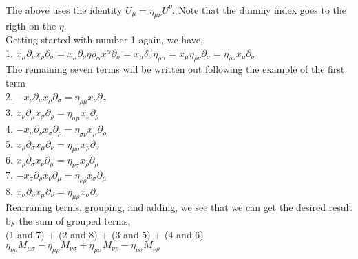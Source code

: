 \documentclass[prb,preprint]
{revtex4-1}
\begin{document}
\\
The above uses the identity $U_\mu = \eta_{\mu\nu}U^\nu$.  Note that the dummy index goes to the rigth on the $\eta$.
\\
Getting started with number 1 again, we have,
\\
1.  $x_\mu \partial_\nu x_\rho \partial_\sigma = x_\mu\partial_\nu\eta{\rho_\alpha}x^\alpha \partial_\sigma = x_\mu \delta_\nu^\alpha \eta_{\rho\alpha} = x_\mu \eta_{\rho\nu} \partial_\sigma = \eta_{\rho\nu} x_\mu \partial_\sigma$
\\
The remaining seven terms will be written out following the example of the first term
\\
2.  $-x_\nu \partial_\mu x_\rho \partial_\sigma = \eta_{\rho\mu} x_\nu \partial_\sigma$
\\
3.  $x_\nu \partial_\mu x_\sigma \partial_\rho = \eta_{\sigma\mu} x_\nu \partial_\rho$
\\
4.  $-x_\mu \partial_\nu x_\sigma \partial_\rho = \eta_{\sigma\nu} x_\mu \partial_\rho$
\\
5.  $x_\rho \partial_\sigma x_\mu \partial_\nu = \eta_{\mu\sigma} x_\rho \partial_\nu$
\\
6.  $x_\rho \partial_\sigma x_\nu \partial_\mu = \eta_{\nu\sigma} x_\rho \partial_\mu$
\\
7.  $-x_\sigma \partial_\rho x_\nu \partial_\mu = \eta_{\nu\rho} x_\sigma \partial_\mu$
\\
8.  $x_\sigma \partial_\rho x_\mu \partial_\nu = \eta_{\mu\rho} x_\sigma \partial_\nu$
\\
Rearraning terms, grouping, and adding, we see that we can get the desired result by the sum of grouped terms, 
\\
(1 and 7) + (2 and 8) + (3 and 5) + (4 and 6)
\\
$\eta_{\nu\rho}M_{\mu\sigma} - \eta_{\mu\rho}M_{\nu\sigma} + \eta_{\mu\sigma}M_{\nu\rho} - \eta_{\nu\sigma}M_{\nu\rho}$




\end{document}
